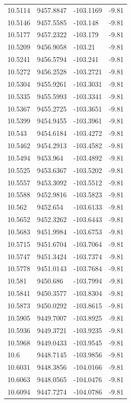 \begin{table}[H]
\begin{tabular}{llll}
10.5114 & 9457.8847 & -103.1169 & -9.81 \\
10.5146 & 9457.5585 & -103.148 & -9.81 \\
10.5177 & 9457.2322 & -103.179 & -9.81 \\
10.5209 & 9456.9058 & -103.21 & -9.81 \\
10.5241 & 9456.5794 & -103.241 & -9.81 \\
10.5272 & 9456.2528 & -103.2721 & -9.81 \\
10.5304 & 9455.9261 & -103.3031 & -9.81 \\
10.5335 & 9455.5993 & -103.3341 & -9.81 \\
10.5367 & 9455.2725 & -103.3651 & -9.81 \\
10.5399 & 9454.9455 & -103.3961 & -9.81 \\
10.543 & 9454.6184 & -103.4272 & -9.81 \\
10.5462 & 9454.2913 & -103.4582 & -9.81 \\
10.5494 & 9453.964 & -103.4892 & -9.81 \\
10.5525 & 9453.6367 & -103.5202 & -9.81 \\
10.5557 & 9453.3092 & -103.5512 & -9.81 \\
10.5588 & 9452.9816 & -103.5823 & -9.81 \\
10.562 & 9452.654 & -103.6133 & -9.81 \\
10.5652 & 9452.3262 & -103.6443 & -9.81 \\
10.5683 & 9451.9984 & -103.6753 & -9.81 \\
10.5715 & 9451.6704 & -103.7064 & -9.81 \\
10.5747 & 9451.3424 & -103.7374 & -9.81 \\
10.5778 & 9451.0143 & -103.7684 & -9.81 \\
10.581 & 9450.686 & -103.7994 & -9.81 \\
10.5841 & 9450.3577 & -103.8304 & -9.81 \\
10.5873 & 9450.0292 & -103.8615 & -9.81 \\
10.5905 & 9449.7007 & -103.8925 & -9.81 \\
10.5936 & 9449.3721 & -103.9235 & -9.81 \\
10.5968 & 9449.0433 & -103.9545 & -9.81 \\
10.6 & 9448.7145 & -103.9856 & -9.81 \\
10.6031 & 9448.3856 & -104.0166 & -9.81 \\
10.6063 & 9448.0565 & -104.0476 & -9.81 \\
10.6094 & 9447.7274 & -104.0786 & -9.81 \\

\end{tabular}
\end{table}
